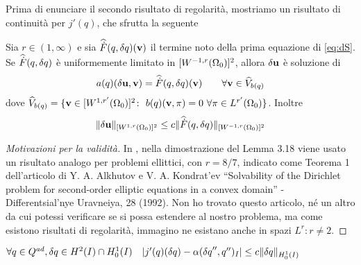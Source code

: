 Prima di enunciare il secondo risultato di regolarità, mostriamo un risultato di continuità per $j'(q)$, che sfrutta la seguente
\begin{prop}
	Sia $r\in(1,\infty)$ e sia $\widehat{\dot{F}}(q,{\delta q})(\mathbf{v})$ il termine noto della prima equazione di \eqref{eq:dS}.\\
	Se $\widehat{\dot{F}}(q,{\delta q})$ è uniformemente limitato in $[W^{-1,r}({\Omega_0})]^2$, allora $\mathbf{\delta u}$ è soluzione di
	$$a(q)(\mathbf{\delta u},\mathbf{v}) = \widehat{\dot{F}}(q,{\delta q})(\mathbf{v})\qquad \forall\mathbf{v}\in \widehat{V}_{b(q)}$$
	dove $\widehat{V}_{b(q)} = \{\mathbf{v}\in [W^{1,r'}({\Omega_0})]^2\colon\ b(q)(\mathbf{v},\pi)=0\ \forall \pi\in L^{r'}({\Omega_0})\}$. Inoltre
	$$\|\mathbf{\delta u}\|_{[W^{1,r}({\Omega_0})]^2}\leq c\|\widehat{\dot{F}}(q,{\delta q})\|_{[W^{-1,r}({\Omega_0})]^2}$$

\label{th:8/7}
\end{prop}
\begin{proof}[Motivazioni per la validità]
	In \cite{Kinigera}, nella dimostrazione del Lemma 3.18 viene usato un risultato analogo per problemi ellittici, con $r=8/7$, indicato come Teorema 1 dell'articolo di Y. A. Alkhutov e V. A. Kondrat'ev ``Solvability of the Dirichlet problem for second-order elliptic equations in a convex domain'' - Differentsial'nye Uravneiya, 28 (1992). Non ho trovato questo articolo, né un altro da cui potessi verificare se si possa estendere al nostro problema, ma come esistono risultati di regolarità, immagino ne esistano anche in spazi $L^r\colon r\neq2$.
\end{proof}
\begin{teor}
	$\forall q\in Q^{ad},{\delta q}\in H^2(I)\cap H^1_0(I)\quad |j'(q)({\delta q})-\alpha({\delta q}'',q'')_I|\leq c\|{\delta q}\|_{H^1_0(I)}$
\label{th:j1continuoH1}
\end{teor}
